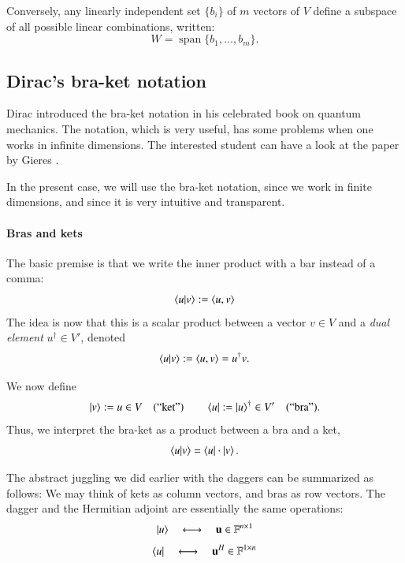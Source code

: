 Conversely, any linearly independent set $\{b_i\}$ of $m$ vectors of $V$ define a subspace of all possible linear combinations, written:
\begin{equation}
    W = \operatorname{span} \{ b_1, \dots, b_m \}.
\end{equation}


\subsection{Dirac's bra-ket notation}

Dirac introduced the bra-ket notation in his celebrated book on quantum mechanics. The notation, which is very useful, has some problems when one works in infinite dimensions. The interested student can have a look at the paper by Gieres .

In the present case, we will use the bra-ket notation, since we work in finite dimensions, and since it is very intuitive and transparent.



\paragraph{Bras and kets}
The basic premise is that we write the inner product with a bar instead of a comma:
\begin{equation}
    \braket{u|v} := \braket{u,v} 
\end{equation}
The idea is now that this is a scalar product between a vector $v \in V$ and a \emph{dual element} $u^\dag \in V'$, denoted
\begin{equation}
    \braket{u|v} := \braket{u,v}  = u^\dag v.
\end{equation}


We now define
\begin{equation}
    \ket{v} := u \in V \quad \text{(``ket'')} \qquad \bra{u} := \ket{u}^\dag \in V' \quad \text{(``bra'')}.
\end{equation}
Thus, we interpret the bra-ket as a product between a bra and a ket,
\begin{equation}
    \braket{u|v} = \bra{u} \cdot \ket{v}.
\end{equation}

\begin{myRemark}{}{}
    The abstract juggling we did earlier with the daggers can be summarized as follows: We may think of kets as column vectors, and bras as row vectors. The dagger and the Hermitian adjoint are essentially the same operations:
    \begin{equation}
        \ket{u} \quad \longleftrightarrow \quad \mathbf{u} \in \mathbb{F}^{n\times 1}
    \end{equation}
    \begin{equation}
        \bra{u} \quad \longleftrightarrow \quad \mathbf{u}^H \in \mathbb{F}^{1\times n}
    \end{equation}
\end{myRemark}

